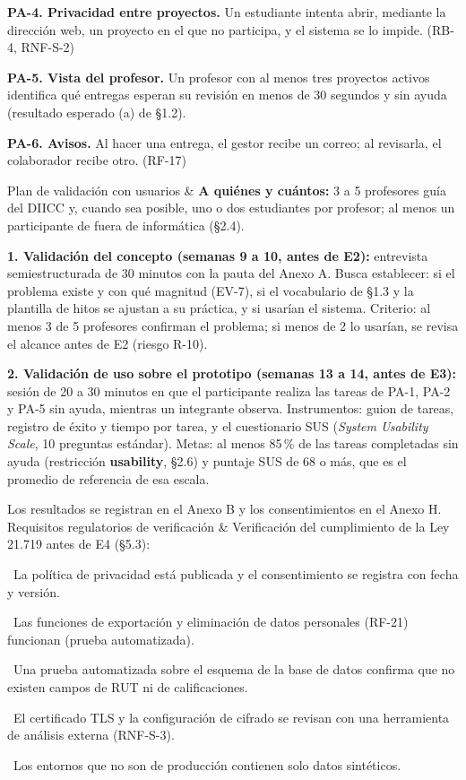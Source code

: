 \documentclass[10pt,a4paper]{article}
\newenvironment{kv}[1][4.6cm]
  {\footnotesize\setlength{\extrarowheight}{3pt}\xltabular{\linewidth}{|E{#1}|L|}\hline}
  {\endxltabular}
\newcommand{\kvrow}[2]{#1 & #2 \\ \hline}
\begin{document}
\begin{kv}
{\textbf{PA-4. Privacidad entre proyectos.} Un estudiante intenta abrir, mediante la dirección web, un proyecto en el que no participa, y el sistema se lo impide. (RB-4, RNF-S-2)\par
\textbf{PA-5. Vista del profesor.} Un profesor con al menos tres proyectos activos identifica qué entregas esperan su revisión en menos de 30 segundos y sin ayuda (resultado esperado (a) de §1.2).\par
\textbf{PA-6. Avisos.} Al hacer una entrega, el gestor recibe un correo; al revisarla, el colaborador recibe otro. (RF-17)}
\kvrow{Plan de validación con usuarios}{%
\textbf{A quiénes y cuántos:} 3 a 5 profesores guía del DIICC y, cuando sea posible, uno o dos estudiantes por profesor; al menos un participante de fuera de informática (§2.4).\par
\textbf{1. Validación del concepto (semanas 9 a 10, antes de E2):} entrevista semiestructurada de 30 minutos con la pauta del Anexo A. Busca establecer: si el problema existe y con qué magnitud (EV-7), si el vocabulario de §1.3 y la plantilla de hitos se ajustan a su práctica, y si usarían el sistema. Criterio: al menos 3 de 5 profesores confirman el problema; si menos de 2 lo usarían, se revisa el alcance antes de E2 (riesgo R-10).\par
\textbf{2. Validación de uso sobre el prototipo (semanas 13 a 14, antes de E3):} sesión de 20 a 30 minutos en que el participante realiza las tareas de PA-1, PA-2 y PA-5 sin ayuda, mientras un integrante observa. Instrumentos: guion de tareas, registro de éxito y tiempo por tarea, y el cuestionario SUS (\emph{System Usability Scale}, 10 preguntas estándar). Metas: al menos 85\,\% de las tareas completadas sin ayuda (restricción \textbf{usability}, §2.6) y puntaje SUS de 68 o más, que es el promedio de referencia de esa escala.\par
Los resultados se registran en el Anexo B y los consentimientos en el Anexo H.}
\kvrow{Requisitos regulatorios de verificación}{Verificación del cumplimiento de la Ley 21.719 antes de E4 (§5.3):\par
\textbullet~La política de privacidad está publicada y el consentimiento se registra con fecha y versión.\par
\textbullet~Las funciones de exportación y eliminación de datos personales (RF-21) funcionan (prueba automatizada).\par
\textbullet~Una prueba automatizada sobre el esquema de la base de datos confirma que no existen campos de RUT ni de calificaciones.\par
\textbullet~El certificado TLS y la configuración de cifrado se revisan con una herramienta de análisis externa (RNF-S-3).\par
\textbullet~Los entornos que no son de producción contienen solo datos sintéticos.}
\end{kv}
\end{document}
